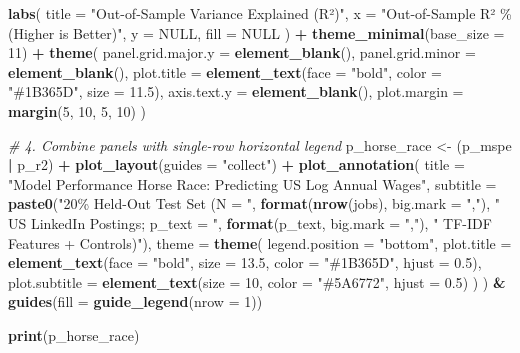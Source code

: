 \documentclass[
]{article}
\newenvironment{Shaded}{\begin{snugshade}}{\end{snugshade}}
\newcommand{\AttributeTok}[1]{\textcolor[rgb]{0.13,0.29,0.53}{#1}}
\newcommand{\CommentTok}[1]{\textcolor[rgb]{0.56,0.35,0.01}{\textit{#1}}}
\newcommand{\ConstantTok}[1]{\textcolor[rgb]{0.56,0.35,0.01}{#1}}
\newcommand{\DecValTok}[1]{\textcolor[rgb]{0.00,0.00,0.81}{#1}}
\newcommand{\FloatTok}[1]{\textcolor[rgb]{0.00,0.00,0.81}{#1}}
\newcommand{\FunctionTok}[1]{\textcolor[rgb]{0.13,0.29,0.53}{\textbf{#1}}}
\newcommand{\NormalTok}[1]{#1}
\newcommand{\OtherTok}[1]{\textcolor[rgb]{0.56,0.35,0.01}{#1}}
\newcommand{\SpecialCharTok}[1]{\textcolor[rgb]{0.81,0.36,0.00}{\textbf{#1}}}
\newcommand{\StringTok}[1]{\textcolor[rgb]{0.31,0.60,0.02}{#1}}
\begin{document}
\begin{Shaded}
\begin{Highlighting}[]
  \FunctionTok{labs}\NormalTok{(}
    \AttributeTok{title =} \StringTok{"Out{-}of{-}Sample Variance Explained (R²)"}\NormalTok{,}
    \AttributeTok{x     =} \StringTok{"Out{-}of{-}Sample R² \% (Higher is Better)"}\NormalTok{,}
    \AttributeTok{y     =} \ConstantTok{NULL}\NormalTok{,}
    \AttributeTok{fill  =} \ConstantTok{NULL}
\NormalTok{  ) }\SpecialCharTok{+}
  \FunctionTok{theme\_minimal}\NormalTok{(}\AttributeTok{base\_size =} \DecValTok{11}\NormalTok{) }\SpecialCharTok{+}
  \FunctionTok{theme}\NormalTok{(}
    \AttributeTok{panel.grid.major.y =} \FunctionTok{element\_blank}\NormalTok{(),}
    \AttributeTok{panel.grid.minor   =} \FunctionTok{element\_blank}\NormalTok{(),}
    \AttributeTok{plot.title         =} \FunctionTok{element\_text}\NormalTok{(}\AttributeTok{face =} \StringTok{"bold"}\NormalTok{, }\AttributeTok{color =} \StringTok{"\#1B365D"}\NormalTok{, }\AttributeTok{size =} \FloatTok{11.5}\NormalTok{),}
    \AttributeTok{axis.text.y        =} \FunctionTok{element\_blank}\NormalTok{(),}
    \AttributeTok{plot.margin        =} \FunctionTok{margin}\NormalTok{(}\DecValTok{5}\NormalTok{, }\DecValTok{10}\NormalTok{, }\DecValTok{5}\NormalTok{, }\DecValTok{10}\NormalTok{)}
\NormalTok{  )}

\CommentTok{\# 4. Combine panels with single{-}row horizontal legend}
\NormalTok{p\_horse\_race }\OtherTok{\textless{}{-}}\NormalTok{ (p\_mspe }\SpecialCharTok{|}\NormalTok{ p\_r2) }\SpecialCharTok{+}
  \FunctionTok{plot\_layout}\NormalTok{(}\AttributeTok{guides =} \StringTok{"collect"}\NormalTok{) }\SpecialCharTok{+}
  \FunctionTok{plot\_annotation}\NormalTok{(}
    \AttributeTok{title    =} \StringTok{"Model Performance Horse Race: Predicting US Log Annual Wages"}\NormalTok{,}
    \AttributeTok{subtitle =} \FunctionTok{paste0}\NormalTok{(}\StringTok{"20\% Held{-}Out Test Set (N = "}\NormalTok{, }\FunctionTok{format}\NormalTok{(}\FunctionTok{nrow}\NormalTok{(jobs), }\AttributeTok{big.mark =} \StringTok{","}\NormalTok{),}
                      \StringTok{" US LinkedIn Postings; p\_text = "}\NormalTok{, }\FunctionTok{format}\NormalTok{(p\_text, }\AttributeTok{big.mark =} \StringTok{","}\NormalTok{),}
                      \StringTok{" TF{-}IDF Features + Controls)"}\NormalTok{),}
    \AttributeTok{theme =} \FunctionTok{theme}\NormalTok{(}
      \AttributeTok{legend.position =} \StringTok{"bottom"}\NormalTok{,}
      \AttributeTok{plot.title      =} \FunctionTok{element\_text}\NormalTok{(}\AttributeTok{face =} \StringTok{"bold"}\NormalTok{, }\AttributeTok{size =} \FloatTok{13.5}\NormalTok{, }\AttributeTok{color =} \StringTok{"\#1B365D"}\NormalTok{, }\AttributeTok{hjust =} \FloatTok{0.5}\NormalTok{),}
      \AttributeTok{plot.subtitle   =} \FunctionTok{element\_text}\NormalTok{(}\AttributeTok{size =} \DecValTok{10}\NormalTok{, }\AttributeTok{color =} \StringTok{"\#5A6772"}\NormalTok{, }\AttributeTok{hjust =} \FloatTok{0.5}\NormalTok{)}
\NormalTok{    )}
\NormalTok{  ) }\SpecialCharTok{\&} \FunctionTok{guides}\NormalTok{(}\AttributeTok{fill =} \FunctionTok{guide\_legend}\NormalTok{(}\AttributeTok{nrow =} \DecValTok{1}\NormalTok{))}

\FunctionTok{print}\NormalTok{(p\_horse\_race)}
\end{Highlighting}
\end{Shaded}
\end{document}
